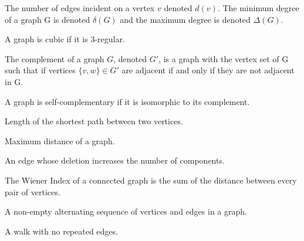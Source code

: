 
\begin{definition}[Degree]
    The number of edges incident on a vertex $v$ denoted $d(v)$. The minimum degree of a graph G is denoted $\delta(G)$ and the maximum degree is denoted $\Delta(G)$.
\end{definition} 

\begin{definition}[Cubic]
    A graph is cubic if it is 3-regular.
\end{definition} 

\begin{definition}[Complement]
    The complement of a graph $G$, denoted $G'$, is a graph with the vertex set of G such that if vertices $\{v,w\}\in G'$ are adjacent if and only if they are not adjacent in G.
\end{definition} 

\begin{definition}
    A graph is self-complementary if it is isomorphic to its complement.
\end{definition} 

\begin{definition}[Distance]
    Length of the shortest path between two vertices.
\end{definition} 

\begin{definition}[Diameter]
    Maximum distance of a graph.
\end{definition} 

\begin{definition}[Bridge]
    An edge whose deletion increases the number of components.
\end{definition} 

\begin{definition}
    The Wiener Index of a connected graph is the sum of the distance between every pair of vertices.
\end{definition} 

\begin{definition}[Walk]
    A non-empty alternating sequence of vertices and edges in a graph.
\end{definition} 

\begin{definition}[Trail]
    A walk with no repeated edges.
\end{definition} 

